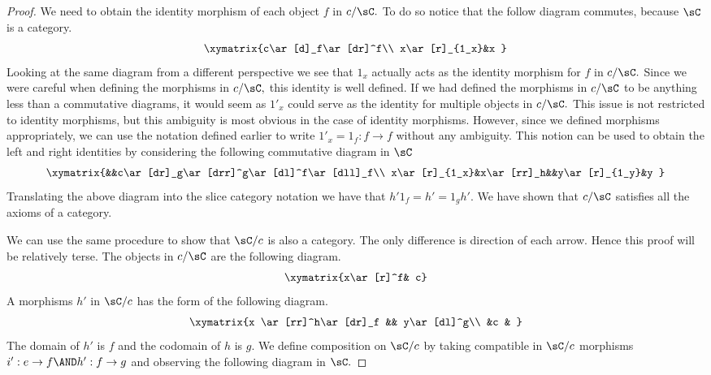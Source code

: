 \documentclass[main.tex]{subfiles}
\begin{document}
\begin{proof}
	We need to obtain the identity morphism of each object \(f\) in
	\(c/\sC.\) To do so notice that the follow diagram commutes, because
	\(\sC\) is a category.
	\[ \xymatrix{c\ar[d]_f\ar[dr]^f\\ x\ar[r]_{1_x}&x } \]
	Looking at the same diagram from a different perspective we see that
	\(1_x\) actually acts as the identity morphism for \(f\) in \(c/\sC.\)
	Since we were careful when defining the morphisms in \(c/\sC,\) this
	identity is well defined. If we had defined the morphisms in \(c/\sC\)
	to be anything less than a commutative diagrams, it would seem as
	\(1'_x\) could serve as the identity for multiple objects in \(c/\sC.\)
	This issue is not restricted to identity morphisms, but this ambiguity is most
	obvious in the case of identity morphisms. However, since we defined
	morphisms appropriately, we can use the notation defined earlier to write
	\(1'_{x}=1_{f}:f\to f\) without any ambiguity. This notion can be used to
	obtain the left and right identities by considering the following
	commutative diagram in \(\sC\)
	\[\xymatrix{&&c\ar[dr]_g\ar[drr]^g\ar[dl]^f\ar[dll]_f\\
	x\ar[r]_{1_x}&x\ar[rr]_h&&y\ar[r]_{1_y}&y }\]
	Translating the above diagram into the slice category notation we have
	that \(h'1_{f}= h'=1_{g}h'.\) We have shown that \(c/\sC\) satisfies all
	the axioms of a category.

	We can use the same procedure to show that \(\sC/c\) is also a category.
	The only difference is direction of each arrow. Hence this proof will be
	relatively terse. The objects in \(c/\sC\) are the following diagram.
	\[\xymatrix{x\ar[r]^f& c}\]
	A morphisms  \(h'\) in \(\sC/c\) has the form of the following diagram.
	\[\xymatrix{x \ar[rr]^h\ar[dr]_f && y\ar[dl]^g\\ &c & }\]
	The domain of \(h'\) is \(f\) and the codomain of \(h\) is \(g.\) We
	define composition on \(\sC/c\) by taking compatible in \(\sC/c\)
	morphisms \(i':e\to f\AND h':f\to g\) and observing the following
	diagram in \(\sC.\)


\end{proof}
\end{document}
